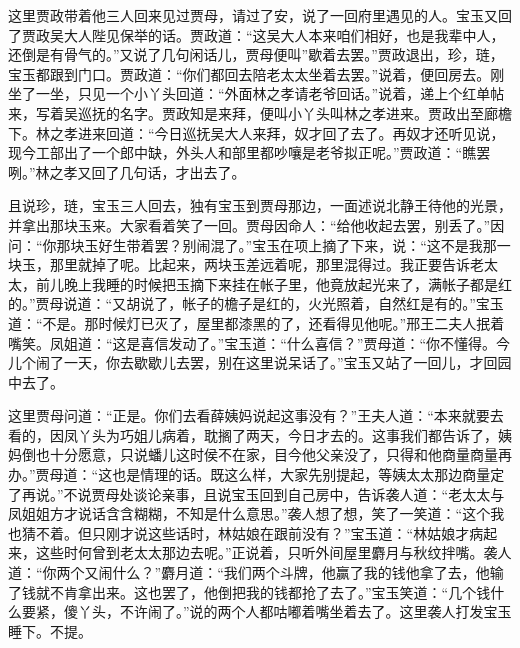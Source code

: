 \begin{parag}
    这里贾政带着他三人回来见过贾母，请过了安，说了一回府里遇见的人。宝玉又回了贾政吴大人陛见保举的话。贾政道：“这吴大人本来咱们相好，也是我辈中人，还倒是有骨气的。”又说了几句闲话儿，贾母便叫”歇着去罢。”贾政退出，珍，琏，宝玉都跟到门口。贾政道：“你们都回去陪老太太坐着去罢。”说着，便回房去。刚坐了一坐，只见一个小丫头回道：“外面林之孝请老爷回话。”说着，递上个红单帖来，写着吴巡抚的名字。贾政知是来拜，便叫小丫头叫林之孝进来。贾政出至廊檐下。林之孝进来回道：“今日巡抚吴大人来拜，奴才回了去了。再奴才还听见说，现今工部出了一个郎中缺，外头人和部里都吵嚷是老爷拟正呢。”贾政道：“瞧罢咧。”林之孝又回了几句话，才出去了。
\end{parag}


\begin{parag}
    且说珍，琏，宝玉三人回去，独有宝玉到贾母那边，一面述说北静王待他的光景，并拿出那块玉来。大家看着笑了一回。贾母因命人：“给他收起去罢，别丢了。”因问：“你那块玉好生带着罢？别闹混了。”宝玉在项上摘了下来，说：“这不是我那一块玉，那里就掉了呢。比起来，两块玉差远着呢，那里混得过。我正要告诉老太太，前儿晚上我睡的时候把玉摘下来挂在帐子里，他竟放起光来了，满帐子都是红的。”贾母说道：“又胡说了，帐子的檐子是红的，火光照着，自然红是有的。”宝玉道：“不是。那时候灯已灭了，屋里都漆黑的了，还看得见他呢。”邢王二夫人抿着嘴笑。凤姐道：“这是喜信发动了。”宝玉道：“什么喜信？”贾母道：“你不懂得。今儿个闹了一天，你去歇歇儿去罢，别在这里说呆话了。”宝玉又站了一回儿，才回园中去了。
\end{parag}


\begin{parag}
    这里贾母问道：“正是。你们去看薛姨妈说起这事没有？”王夫人道：“本来就要去看的，因凤丫头为巧姐儿病着，耽搁了两天，今日才去的。这事我们都告诉了，姨妈倒也十分愿意，只说蟠儿这时侯不在家，目今他父亲没了，只得和他商量商量再办。”贾母道：“这也是情理的话。既这么样，大家先别提起，等姨太太那边商量定了再说。”不说贾母处谈论亲事，且说宝玉回到自己房中，告诉袭人道：“老太太与凤姐姐方才说话含含糊糊，不知是什么意思。”袭人想了想，笑了一笑道：“这个我也猜不着。但只刚才说这些话时，林姑娘在跟前没有？”宝玉道：“林姑娘才病起来，这些时何曾到老太太那边去呢。”正说着，只听外间屋里麝月与秋纹拌嘴。袭人道：“你两个又闹什么？”麝月道：“我们两个斗牌，他赢了我的钱他拿了去，他输了钱就不肯拿出来。这也罢了，他倒把我的钱都抢了去了。”宝玉笑道：“几个钱什么要紧，傻丫头，不许闹了。”说的两个人都咕嘟着嘴坐着去了。这里袭人打发宝玉睡下。不提。
\end{parag}


